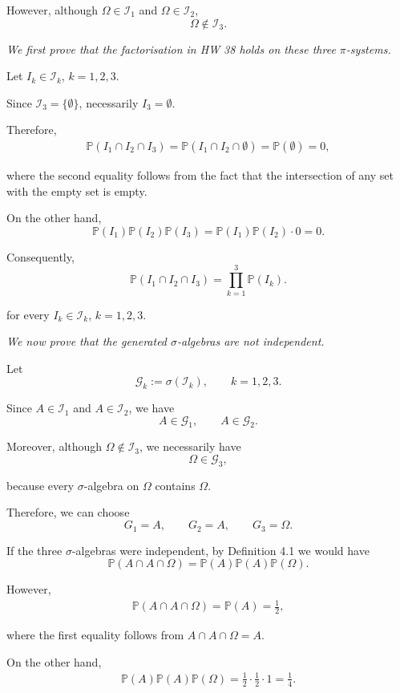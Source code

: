 \documentclass[11pt,a4paper]{article}
\begin{document}
However, although $\Omega\in\mathcal I_1$ and $\Omega\in\mathcal I_2$,
\[
\Omega\notin\mathcal I_3.
\]

\emph{We first prove that the factorisation in HW 38 holds on these three $\pi$-systems.}

Let $I_k\in\mathcal I_k$, $k=1,2,3$.

Since $\mathcal I_3=\{\emptyset\}$, necessarily $I_3=\emptyset$.

Therefore,
\[
\begin{aligned}
\mathbb P(I_1\cap I_2\cap I_3)
=\mathbb P(I_1\cap I_2\cap\emptyset) =\mathbb P(\emptyset) =0,
\end{aligned}
\]

where the second equality follows from the fact that the intersection of any set with the empty set is empty.

On the other hand,
\[
\mathbb P(I_1)\mathbb P(I_2)\mathbb P(I_3)
=
\mathbb P(I_1)\mathbb P(I_2)\cdot0
=
0.
\]

Consequently,
\[
\mathbb P(I_1\cap I_2\cap I_3)
=
\prod_{k=1}^{3}\mathbb P(I_k).
\]

for every $I_k\in\mathcal I_k$, $k=1,2,3$.

\emph{We now prove that the generated $\sigma$-algebras are not independent.}

Let
\[
\mathcal G_k:=\sigma(\mathcal I_k),
\qquad k=1,2,3.
\]

Since $A\in\mathcal I_1$ and $A\in\mathcal I_2$, we have
\[
A\in\mathcal G_1,
\qquad
A\in\mathcal G_2.
\]

Moreover, although $\Omega\notin\mathcal I_3$, we necessarily have
\[
\Omega\in\mathcal G_3,
\]

because every $\sigma$-algebra on $\Omega$ contains $\Omega$.

Therefore, we can choose
\[
G_1=A,\qquad G_2=A,\qquad G_3=\Omega.
\]

If the three $\sigma$-algebras were independent, by Definition 4.1 we would have
\[
\mathbb P(A\cap A\cap\Omega)
=
\mathbb P(A)\mathbb P(A)\mathbb P(\Omega).
\]

However,
\[
\begin{aligned}
\mathbb P(A\cap A\cap\Omega)
=\mathbb P(A) =\frac12,
\end{aligned}
\]

where the first equality follows from $A\cap A\cap\Omega=A$.

On the other hand,
\[
\begin{aligned}
\mathbb P(A)\mathbb P(A)\mathbb P(\Omega)
=\frac12\cdot\frac12\cdot1 =\frac14.
\end{aligned}
\]
\end{document}
